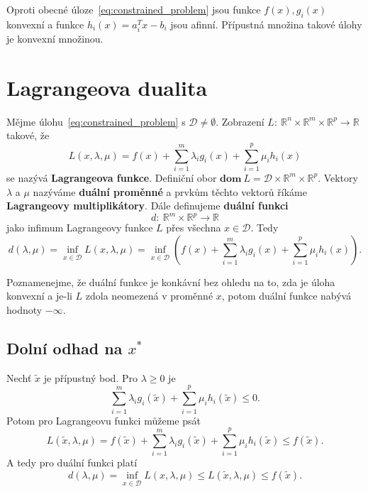 Oproti obecné úloze~\ref{eq:constrained_problem} jsou funkce $f(x), g_i(x)$ konvexní a funkce $h_i(x) = a_i^Tx - b_i$ jsou afinní. Přípustná množina takové úlohy je konvexní množinou.

\section{Lagrangeova dualita}

Mějme úlohu~\ref{eq:constrained_problem} s $\mathcal{D} \neq \emptyset$. Zobrazení $L:\ \mathbb{R}^n \times \mathbb{R}^m \times \mathbb{R}^p \rightarrow \mathbb{R}$ takové, že
\begin{equation}
    L(x, \lambda, \mu) = f(x) + \sum_{i=1}^m \lambda_i g_i(x) + \sum_{i=1}^p \mu_i h_i(x)
\end{equation}
se nazývá \textbf{Lagrangeova funkce}. Definiční obor $\textbf{dom}\ L = \mathcal{D} \times \mathbb{R}^m \times \mathbb{R}^p$. Vektory $\lambda$ a $\mu$ nazýváme \textbf{duální proměnné} a prvkům těchto vektorů říkáme \textbf{Lagrangeovy multiplikátory}. Dále definujeme \textbf{duální funkci}
$$
    d:\ \mathbb{R}^m \times \mathbb{R}^p \rightarrow \mathbb{R}
$$
jako infimum Lagrangeovy funkce $L$ přes všechna $x \in \mathcal{D}$. Tedy
\begin{equation}
    d(\lambda, \mu) = \inf_{x \in \mathcal{D}} L(x, \lambda, \mu) = \inf_{x \in \mathcal{D}} \left( f(x) + \sum_{i=1}^m \lambda_i g_i(x) + \sum_{i=1}^p \mu_i h_i(x) \right).
\end{equation}

Poznamenejme, že duální funkce je konkávní bez ohledu na to, zda je úloha konvexní a je-li $L$ zdola neomezená v proměnné $x$, potom duální funkce nabývá hodnoty $-\infty$.

\subsection{Dolní odhad na $x^*$}\label{s:lower_bound}

Nechť $\tilde{x}$ je přípustný bod. Pro $\lambda \geq 0$ je
$$
    \sum_{i=1}^m \lambda_i g_i(\tilde{x}) + \sum_{i=1}^p \mu_i h_i(\tilde{x}) \leq 0.
$$
Potom pro Lagrangeovu funkci můžeme psát
$$
    L(\tilde{x}, \lambda, \mu) = f(\tilde{x}) + \sum_{i=1}^m \lambda_i g_i(\tilde{x}) + \sum_{i=1}^p \mu_i h_i(\tilde{x}) \leq f(\tilde{x}).
$$
A tedy pro duální funkci platí
$$
    d(\lambda, \mu) = \inf_{x \in \mathcal{D}} L(x, \lambda, \mu) \leq L(\tilde{x}, \lambda, \mu) \leq f(\tilde{x}).
$$

